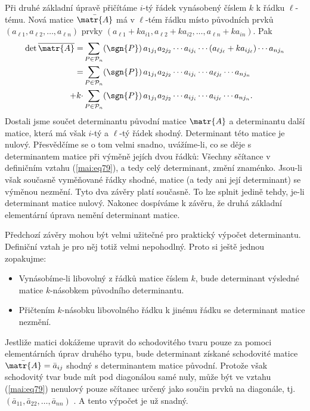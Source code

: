       Při druhé základní úpravě přičítáme \(i\)-tý řádek vynásobený číslem \(k\) k řádku
      \(\ell\)-tému. Nová matice \(\bar{\matr{A}}\) má v \(\ell\)-tém řádku místo původních prvků
      \((a_{\ell1}, a_{\ell2},\ldots, a_{\ell n})\) prvky \((a_{\ell1} + ka_{i1}, a_{\ell2} +
      ka_{i2},\ldots, a_{\ell n} + ka_{in})\). Pak
      \begin{gather*}
       \begin{align*}
         \det{\overline{\matr{A}}} = %
                &\sum_{P\in \mathcal{P}_n} 
                  (\sgn{P})\,a_{1j_1}a_{2j_2}\cdots a_{ij_i} 
                  \cdots (a_{\ell j_\ell} + ka_{ij_\ell})\cdots a_{nj_n}   \\
               =&\sum_{P\in \mathcal{P}_n} 
                  (\sgn{P})\,a_{1j_1}a_{2j_2}\cdots a_{ij_i}\cdots a_{\ell j_\ell}\cdots a_{nj_n} \\
         +k\cdot&\sum_{P\in \mathcal{P}_n} 
                  (\sgn{P})\,a_{1j_1}a_{2j_2}\cdots a_{ij_i} \cdots a_{ij_\ell} \cdots a_{nj_n}.
       \end{align*}
      \end{gather*}
      Dostali jsme součet determinantu původní matice \(\matr{A}\) a determinantu další matice,
      která má však \(i\)-tý a \(\ell\)-tý řádek shodný. Determinant této matice je nulový.
      Přesvědčíme se o tom velmi snadno, uvážíme-li, co se děje s determinantem matice při výměně
      jejích dvou řádků: Všechny sčítance v definičním vztahu (\ref{mai:eq79}), a tedy celý
      determinant, změní znaménko. Jsou-li však současně vyměňované řádky shodné, matice (a tedy ani
      její determinant) se výměnou nezmění. Tyto dva závěry platí současně. To lze splnit jedině
      tehdy, je-li determinant matice nulový. Nakonec dospíváme k závěru, že druhá základní
      elementární úprava nemění determinant matice. 

      Předchozí závěry mohou být velmi užitečné pro praktický výpočet determinantu. Definiční vztah
      je pro něj totiž velmi nepohodlný. Proto si ještě jednou zopakujme:
      \begin{mdframed}[style=highlight]
        \begin{itemize}[noitemsep]
          \item Vynásobíme-li libovolný z řádků matice číslem \(k\), bude determinant výsledné
                matice \(k\)-násobkem původního determinantu.
          \item Přičtením \(k\)-násobku libovolného řádku k jinému řádku se determinant matice
                nezmění.
        \end{itemize}
      \end{mdframed} 
      Jestliže matici dokážeme upravit do schodovitého tvaru pouze za pomoci elementárních úprav
      druhého typu, bude determinant získané schodovité matice \(\bar{\matr{A}} =\bar{a}_{ij}\)
      shodný s determinantem matice původní. Protože však schodovitý tvar bude mít pod diagonálou
      samé nuly, může být ve vztahu (\ref{mai:eq79}) nenulový pouze sčítanec určený jako součin
      prvků na diagonále, tj. \((\bar{a}_{11}, \bar{a}_{22}, \ldots, \bar{a}_{nn})\) . A tento
      výpočet je už snadný.

